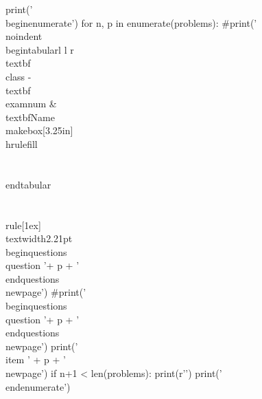 \documentclass[12pt]{exam}
\newcommand{\class}{PHYS 110}
\newcommand{\examnum}{C10 (v2)}
\begin{document}
\begin{pycode}
print('\\begin{enumerate}')
for n, p in enumerate(problems):
    #print('\\noindent \\begin{tabular}{l l r} \\textbf{\\class} - \\textbf{\\examnum}  & \\textbf{Name} \\makebox[3.25in]{\\hrulefill}  \\\\ \\end{tabular} \\\\ \\rule[1ex]{\\textwidth}{2.21pt} \\begin{questions}\\question '+ p + '\\end{questions}\\newpage')
    #print('\\begin{questions}\\question '+ p + '\\end{questions}\\newpage')
    print('\\item ' + p + '\\newpage')
    if n+1 < len(problems):
        print(r'\vspace{1in}')
print('\\end{enumerate}')


\end{pycode}


	
\end{document}
